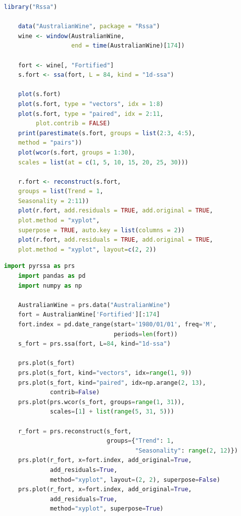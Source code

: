 \documentclass[specialist,
			   substylefile = spbu_report.rtx,
			   subf,href,colorlinks=true, 12pt]{disser}
\begin{document}
\begin{lstlisting}[language=R, caption=Программный код для визуализации разложения и восстановления ряда AustralianWine на языке R.]
	library("Rssa")
	
	data("AustralianWine", package = "Rssa")
	wine <- window(AustralianWine, 
	               end = time(AustralianWine)[174])
	
	fort <- wine[, "Fortified"]
	s.fort <- ssa(fort, L = 84, kind = "1d-ssa")
	
	plot(s.fort)
	plot(s.fort, type = "vectors", idx = 1:8)
	plot(s.fort, type = "paired", idx = 2:11, 
	     plot.contrib = FALSE)
	print(parestimate(s.fort, groups = list(2:3, 4:5), 
	method = "pairs"))
	plot(wcor(s.fort, groups = 1:30),
	scales = list(at = c(1, 5, 10, 15, 20, 25, 30)))
	
	r.fort <- reconstruct(s.fort, 
	groups = list(Trend = 1,
	Seasonality = 2:11))
	plot(r.fort, add.residuals = TRUE, add.original = TRUE,
	plot.method = "xyplot",
	superpose = TRUE, auto.key = list(columns = 2))
	plot(r.fort, add.residuals = TRUE, add.original = TRUE,
	plot.method = "xyplot", layout=c(2, 2))
\end{lstlisting}

\begin{lstlisting}[language=Python, caption=Программный код для визуализации разложения и восстановления ряда AustralianWine на языке Python.]
	import pyrssa as prs
	import pandas as pd
	import numpy as np
	
	AustralianWine = prs.data("AustralianWine")
	fort = AustralianWine['Fortified'][:174]
	fort.index = pd.date_range(start='1980/01/01', freq='M', 
	                           periods=len(fort))
	s_fort = prs.ssa(fort, L=84, kind="1d-ssa")
	
	prs.plot(s_fort)
	prs.plot(s_fort, kind="vectors", idx=range(1, 9))
	prs.plot(s_fort, kind="paired", idx=np.arange(2, 13), 
			 contrib=False)
	prs.plot(prs.wcor(s_fort, groups=range(1, 31)),
	         scales=[1] + list(range(5, 31, 5)))
	
	r_fort = prs.reconstruct(s_fort,
	                         groups={"Trend": 1, 
                         	         "Seasonality": range(2, 12)})
	prs.plot(r_fort, x=fort.index, add_original=True, 
             add_residuals=True,
             method="xyplot", layout=(2, 2), superpose=False)
	prs.plot(r_fort, x=fort.index, add_original=True, 
             add_residuals=True,
             method="xyplot", superpose=True)
\end{lstlisting}
\end{document}
